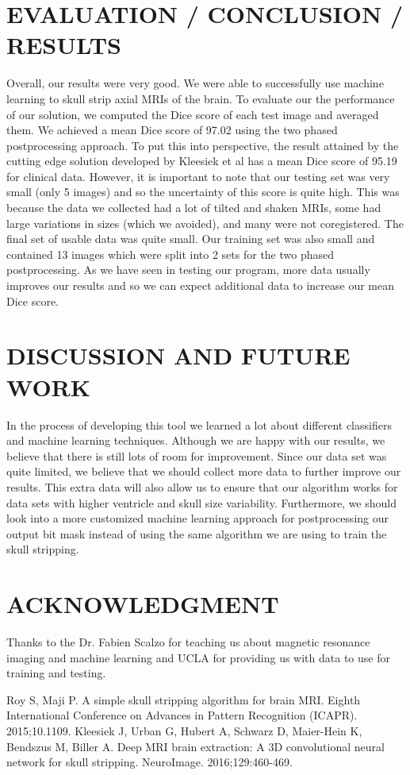 \documentclass[letterpaper, 10 pt, conference]{ieeeconf}
\begin{document}
\section{EVALUATION / CONCLUSION / RESULTS}
Overall, our results were very good. We were able to successfully use machine learning to skull strip axial MRIs of the brain. To evaluate our the performance of our solution, we computed the Dice score of each test image and averaged them. We achieved a mean Dice score of 97.02 using the two phased postprocessing approach. To put this into perspective, the result attained by the cutting edge solution developed by Kleesiek et al has a mean Dice score of 95.19 for clinical data. However, it is important to note that our testing set was very small (only 5 images) and so the uncertainty of this score is quite high. This was because the data we collected had a lot of tilted and shaken MRIs, some had large variations in sizes (which we avoided), and many were not coregistered. The final set of usable data was quite small. Our training set was also small and contained 13 images which were split into 2 sets for the two phased postprocessing. As we have seen in testing our program, more data usually improves our results and so we can expect additional data to increase our mean Dice score.

\section{DISCUSSION AND FUTURE WORK}
In the process of developing this tool we learned a lot about different classifiers and machine learning techniques. Although we are happy with our results, we believe that there is still lots of room for improvement. Since our data set was quite limited, we believe that we should collect more data to further improve our results. This extra data will also allow us to ensure that our algorithm works for data sets with higher ventricle and skull size variability. Furthermore, we should look into a more customized machine learning approach for postprocessing our output bit mask instead of using the same algorithm we are using to train the skull stripping.

\section*{ACKNOWLEDGMENT}

Thanks to the Dr. Fabien Scalzo for teaching us about magnetic resonance imaging and machine learning and UCLA for providing us with data to use for training and testing.

\begin{thebibliography}{99}

 Roy S, Maji P. A simple skull stripping algorithm for brain MRI. Eighth International Conference on Advances in Pattern Recognition (ICAPR). 2015;10.1109.
 Kleesiek J, Urban G, Hubert A, Schwarz D, Maier-Hein K, Bendszus M, Biller A. Deep MRI brain extraction: A 3D convolutional neural network for skull stripping. NeuroImage. 2016;129:460-469.

\end{thebibliography}
\end{document}
